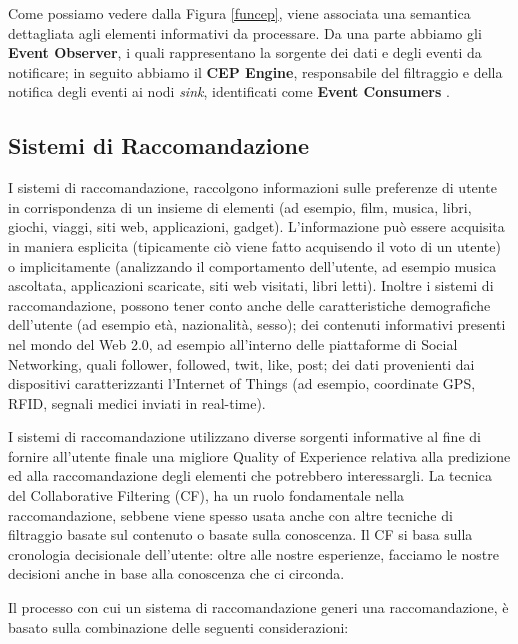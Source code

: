 \documentclass[11pt]{article}
\begin{document}
Come possiamo vedere dalla Figura \ref{funcep}, viene associata una semantica dettagliata agli elementi informativi da processare. Da una parte abbiamo gli \textbf{Event Observer}, i quali rappresentano la sorgente dei dati e degli eventi da notificare; in seguito abbiamo il \textbf{CEP Engine}, responsabile del filtraggio e della notifica degli eventi ai nodi \textit{sink}, identificati come \textbf{Event Consumers} \cite{Cugola:2012:PFI:2187671.2187677,fulop2010survey}.

\subsection{Sistemi di Raccomandazione}
I sistemi di raccomandazione, raccolgono informazioni sulle preferenze di utente in corrispondenza di un insieme di elementi (ad esempio, film, musica, libri, giochi, viaggi, siti web, applicazioni, gadget). L'informazione può essere acquisita in maniera esplicita (tipicamente ciò viene fatto acquisendo il voto di un utente) o implicitamente (analizzando il comportamento dell'utente, ad esempio musica ascoltata, applicazioni scaricate, siti web visitati, libri letti). Inoltre i sistemi di raccomandazione, possono tener conto anche delle caratteristiche demografiche dell'utente (ad esempio età, nazionalità, sesso); dei contenuti informativi presenti nel mondo del Web 2.0, ad esempio all'interno delle piattaforme di Social Networking, quali follower, followed, twit, like, post; dei dati provenienti dai dispositivi caratterizzanti l'Internet of Things (ad esempio, coordinate GPS, RFID, segnali medici inviati in real-time). 

I sistemi di raccomandazione utilizzano diverse sorgenti informative al fine di fornire all'utente finale una migliore Quality of Experience relativa alla predizione ed alla raccomandazione degli elementi che potrebbero interessargli. La tecnica del Collaborative Filtering (CF), ha un ruolo fondamentale nella raccomandazione, sebbene viene spesso usata anche con altre tecniche di filtraggio basate sul contenuto o basate sulla conoscenza. Il CF si basa sulla cronologia decisionale dell'utente: oltre alle nostre esperienze, facciamo le nostre decisioni anche in base alla conoscenza che ci circonda.

Il processo con cui un sistema di raccomandazione generi una raccomandazione, è basato sulla combinazione delle seguenti considerazioni:
\end{document}
